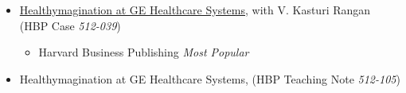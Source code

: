\documentclass[margin, line, centered, 10pt]{res}
\begin{document}
\begin{resume}
\begin{itemize}
\item \href{https://www.thecasecentre.org/main/products/view?id=106766}{Healthymagination at GE Healthcare Systems}, with V. Kasturi Rangan (HBP Case \textit{512-039})
\begin{itemize}
\item Harvard Business Publishing \textit{Most Popular}
\end{itemize}
\item Healthymagination at GE Healthcare Systems, (HBP Teaching Note \textit{512-105})
\end{itemize}




\end{resume}
\end{document}
